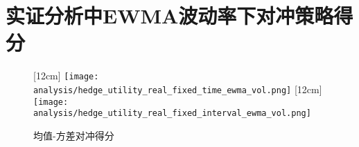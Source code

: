 \chapter{实证分析中EWMA波动率下对冲策略得分}
\label{app:utility_result_real}

\begin{figure}[htb]
  \centering
  [12cm]
    {\texttt{[image: analysis/hedge\_utility\_real\_fixed\_time\_ewma\_vol.png]}}
  \hspace{0.5cm}
  [12cm]
    {\texttt{[image: analysis/hedge\_utility\_real\_fixed\_interval\_ewma\_vol.png]}}
    \caption[这里将出现在插图索引中]
    {均值-方差对冲得分}
  \label{fig:hedge_utility_real_fix_ewma1}
\end{figure}
